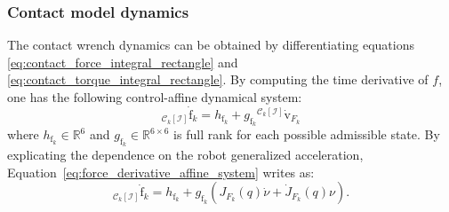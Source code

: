 \subsubsection{Contact model dynamics}
The contact wrench dynamics can be obtained by differentiating equations \eqref{eq:contact_force_integral_rectangle} and \eqref{eq:contact_torque_integral_rectangle}. 
By computing the time derivative of $f$, one has the following control-affine dynamical system:
\begin{equation}
    \label{eq:force_derivative_affine_system}
    {}_{\mathcal{C}_k[\mathcal{I}]}\dot{\mathrm{f}}_k  =  h_{\mathrm{f}_k} + g_{\mathrm{f}_k} {}^{\mathcal{C}_k[\mathcal{I}]}\dot{\mathrm{v}}_{F_k}
\end{equation}
where $h_{\mathrm{f}_k} \in \mathbb{R}^6$ and $g_{\mathrm{f}_k}\in\mathbb{R}^{6 \times 6}$ is full rank for each possible admissible state. By explicating the dependence on the robot generalized acceleration, Equation~\eqref{eq:force_derivative_affine_system} writes as:
\begin{equation}
 \label{eq:contact_wrench_dynamics_qp}
 {}_{\mathcal{C}_k[\mathcal{I}]}\dot{\mathrm{f}}_k  =  h_{\mathrm{f}_k} + g_{\mathrm{f}_k} \left(J_{F_k}(q) \dot{\nu} + \dot{J}_{F_k}(q) \nu \right).
\end{equation}

